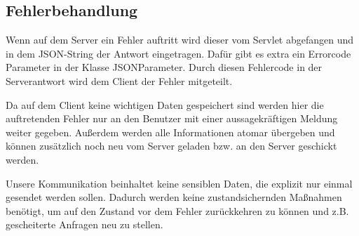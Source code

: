\begin {center}
\end {center}

	\subsection{Fehlerbehandlung}
Wenn auf dem Server ein Fehler auftritt wird dieser vom Servlet abgefangen und in dem JSON-String der Antwort eingetragen. Dafür gibt es extra ein Errorcode Parameter in der Klasse JSONParameter. Durch diesen Fehlercode in der Serverantwort wird dem Client der Fehler mitgeteilt.\par

Da auf dem Client keine wichtigen Daten gespeichert sind werden hier die auftretenden Fehler nur an den Benutzer mit einer aussagekräftigen Meldung weiter gegeben. Außerdem werden alle Informationen atomar übergeben und können zusätzlich noch neu vom Server geladen bzw. an den Server geschickt werden. \par

Unsere Kommunikation beinhaltet keine sensiblen Daten, die explizit nur einmal gesendet werden sollen. Dadurch werden keine zustandsichernden Maßnahmen benötigt, um auf den Zustand vor dem Fehler zurückkehren zu können und z.B. gescheiterte Anfragen neu zu stellen.

	\newpage
